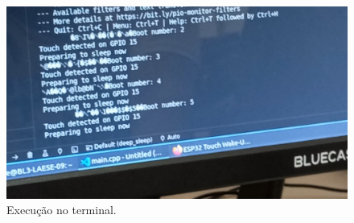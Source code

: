 \documentclass[12pt]{article}
\begin{document}
\begin{figure}[h]
    \centering
    \includegraphics[width=0.5\linewidth]{img/Execução_Terminal.jpg}
    \caption{Execução no terminal.}
    \label{fig:terminal}
\end{figure}
\end{document}
